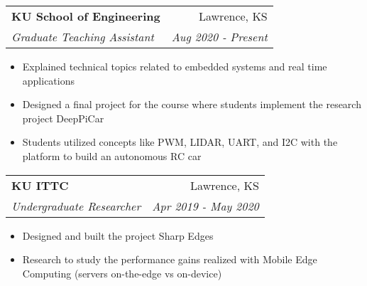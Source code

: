 \documentclass[letterpaper,10pt]{article}
\makeatletter
\newcommand{\resumeItem}[2]{
  \item\normalsize{
    {#1}{#2 \vspace{-2pt}}
  }
}
\newcommand{\resumeSubheading}[4]{
  \vspace{-1pt}\item[]
  \begin{tabular*}{0.98\textwidth}{l@{\extracolsep{\fill}}r}
      \hspace{-10pt}\textbf{#1} & #2 \\
      \hspace{-10pt}\textit{\normalsize#3} & \textit{\normalsize #4} \\
    \end{tabular*}\vspace{-3pt}
}
\newcommand{\resumeItemListStart}{\begin{itemize}}
\newcommand{\resumeItemListEnd}{\end{itemize}\vspace{-5pt}}
\makeatother
\begin{document}
{    \vspace{6pt}
   
    \resumeSubheading
    {KU School of Engineering}{Lawrence, KS}
    {Graduate Teaching Assistant}{Aug 2020 - Present}
      \resumeItemListStart
      \resumeItem{}
        {Explained technical topics related to embedded systems and real time applications}
        \vspace{1pt}
      \resumeItem{}
        {Designed a final project for the course where students implement the research project DeepPiCar}
        \vspace{1pt}
      \resumeItem{}
        {Students utilized concepts like PWM, LIDAR, UART, and I2C with the platform to build an autonomous RC car}
    \resumeItemListEnd

    \vspace{6pt}

    \resumeSubheading
      {KU ITTC}{Lawrence, KS}
      {Undergraduate Researcher}{Apr 2019 - May 2020}
      \resumeItemListStart

        \resumeItem{}
          {Designed and built the project Sharp Edges}
          \vspace{1pt}
        \resumeItem{}
          {Research to study the performance gains realized with Mobile Edge Computing (servers on-the-edge vs on-device)}
      \resumeItemListEnd
      
}
\end{document}
